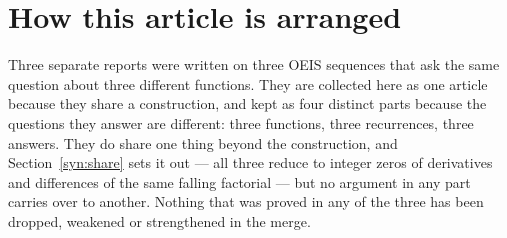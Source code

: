 \documentclass[11pt,a4paper]{article}
\numberwithin{equation}{section}
\theoremstyle{definition}
\theoremstyle{remark}
\theoremstyle{plain}
\begin{document}
\begin{abstract}
All computations reported here are exact.  Every modular certificate is
confirmed by exact integer arithmetic before a coefficient is declared to
vanish, so no claim rests on a probabilistic zero test; but every computation
certifies a finite range and none of them is an all-$n$ proof.
\end{abstract}

\setcounter{tocdepth}{2}
\tableofcontents
\clearpage

\section*{How this article is arranged}

Three separate reports were written on three OEIS sequences that ask the same
question about three different functions.  They are collected here as one
article because they share a construction, and kept as four distinct parts
because the questions they answer are different: three functions, three
recurrences, three answers.  They do share one thing beyond the construction,
and Section~\ref{syn:share} sets it out --- all three reduce to integer zeros of
derivatives and differences of the same falling factorial --- but no argument in
any part carries over to another.  Nothing that was proved in any of the three
has been dropped, weakened or strengthened in the merge.
\end{document}
